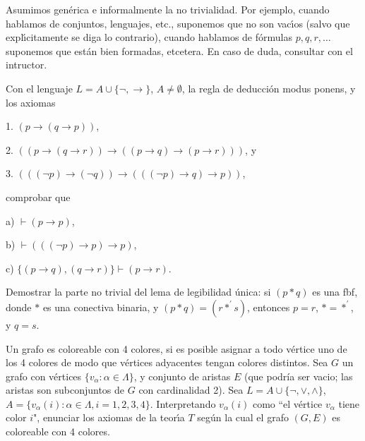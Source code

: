 Asumimos gen\'erica e informalmente la no trivialidad. Por ejemplo,
cuando hablamos de conjuntos, lenguajes, etc., suponemos que no  son vac\'{\i}os (salvo que 
expl\'{\i}citamente
se diga lo contrario),  cuando hablamos de f\'ormulas $p, q, r, \dots$ 
suponemos que est\'an bien formadas, etcetera.
En caso de duda, consultar con el intructor. 

\begin{problem}[1]
Con el lenguaje $L = A \cup \{\neg, \to\}$, $A \ne \emptyset$, la regla de deducci\'on modus ponens,
y los axiomas

1.  $ (p\to (q\to p))$,

2. $( (p\to (q\to r)) \to  ( (p\to q) \to (p\to r)))$, y

3. $(( (\neg p) \to (\neg q)) \to  ( ((\neg p) \to q) \to p))$,

comprobar que 

a) $\vdash (p\to p)$,

b) $\vdash ((( \neg p) \to p)\to p)$,

c)  $\{(p\to q), (q\to r)\} \vdash (p\to r)$.
\solution
\end{problem} 

\begin{problem}[2]
Demostrar la parte no trivial del lema de legibilidad \'unica: si $(p * q)$ es una fbf, donde $*$ es una conectiva
binaria, y $(p * q) = (r *^\prime s)$, entonces $p = r$,  $*  = *^\prime$, y $q = s$.
\solution
\end{problem}


\begin{problem}[3]
Un grafo es coloreable con 4 colores, si es posible asignar a todo v\'ertice uno de los 4 colores de modo
que v\'ertices adyacentes tengan colores distintos. Sea $G$ un grafo con v\'ertices $\{v_\alpha : \alpha \in\Lambda\}$,
y conjunto de aristas $E$ (que podr\'ia ser vacio; las aristas son subconjuntos de $G$ con cardinalidad 2).
Sea $L =  A \cup \{\neg, \vee, \wedge \}$, $A = \{v_\alpha(i) : \alpha \in\Lambda, i = 1, 2, 3, 4\}$. Interpretando 
$v_\alpha(i)$ como ``el v\'ertice $v_\alpha$ tiene color $i$", enunciar los axiomas de la teor\'{\i}a $T$ seg\'un la
cual el grafo $(G, E)$ es coloreable con 4 colores. 
\solution
\end{problem}
